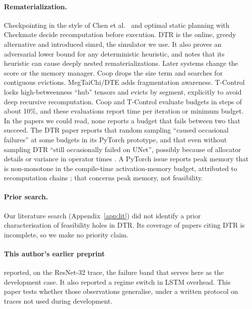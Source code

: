 \documentclass[11pt]{article}
\begin{document}
\paragraph{Rematerialization.} Checkpointing in the style of Chen et al.\ \cite{chen2016}
and optimal static planning with Checkmate \cite{jain2020checkmate} decide recomputation
before execution. DTR \cite{kirisame2021dtr} is the online, greedy alternative and
introduced simrd, the simulator we use. It also proves an adversarial lower bound for any
deterministic heuristic, and notes that its heuristic can cause deeply nested
rematerializations. Later systems change the score or the memory manager. Coop
\cite{zhang2023coop} drops the size term and searches for contiguous evictions.
MegTaiChi/DTE \cite{hu2022megtaichi} adds fragmentation awareness. T-Control
\cite{wang2026tcontrol} locks high-betweenness ``hub'' tensors and evicts by segment,
explicitly to avoid deep recursive recomputation. Coop and T-Control evaluate budgets in steps of about 10\%, and these evaluations report
time per iteration or minimum budget. In the papers we could read,
none reports a budget that fails between two that succeed. The DTR paper reports that random sampling ``caused occasional
failures'' at some budgets in its PyTorch prototype, and that even without sampling DTR
``still occasionally failed on UNet'', possibly because of allocator details or variance in
operator times \cite{kirisame2021dtr}. A PyTorch issue reports peak memory that is non-monotone in
the compile-time activation-memory budget, attributed to recomputation chains
\cite{pytorch197838}; that concerns peak memory, not feasibility.

\paragraph{Prior search.} Our literature search (Appendix~\ref{app:lit}) did not identify a
prior characterisation of feasibility holes in DTR. Its coverage of papers citing DTR is
incomplete, so we make no priority claim.

\paragraph{This author's earlier preprint} \cite{pagadala2026regime} reported, on the
ResNet-32 trace, the failure band that serves here as the development case. It also
reported a regime switch in LSTM overhead. This paper tests whether those observations
generalise, under a written protocol on traces not used during development.
\end{document}

